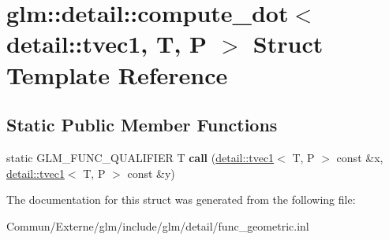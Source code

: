 \hypertarget{structglm_1_1detail_1_1compute__dot_3_01detail_1_1tvec1_00_01_t_00_01_p_01_4}{}\section{glm\+:\+:detail\+:\+:compute\+\_\+dot$<$ detail\+:\+:tvec1, T, P $>$ Struct Template Reference}
\label{structglm_1_1detail_1_1compute__dot_3_01detail_1_1tvec1_00_01_t_00_01_p_01_4}
\subsection*{Static Public Member Functions}
\begin{DoxyCompactItemize}
\item 
static G\+L\+M\+\_\+\+F\+U\+N\+C\+\_\+\+Q\+U\+A\+L\+I\+F\+I\+ER T {\bfseries call} (\hyperlink{structglm_1_1detail_1_1tvec1}{detail\+::tvec1}$<$ T, P $>$ const \&x, \hyperlink{structglm_1_1detail_1_1tvec1}{detail\+::tvec1}$<$ T, P $>$ const \&y)\hypertarget{structglm_1_1detail_1_1compute__dot_3_01detail_1_1tvec1_00_01_t_00_01_p_01_4_a8a857cb8e3ad91ffec9e5d2e8517be41}{}\label{structglm_1_1detail_1_1compute__dot_3_01detail_1_1tvec1_00_01_t_00_01_p_01_4_a8a857cb8e3ad91ffec9e5d2e8517be41}

\end{DoxyCompactItemize}


The documentation for this struct was generated from the following file\+:\begin{DoxyCompactItemize}
\item 
Commun/\+Externe/glm/include/glm/detail/func\+\_\+geometric.\+inl\end{DoxyCompactItemize}
